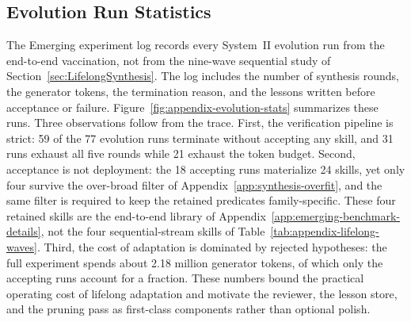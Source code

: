 \subsection{Evolution Run Statistics}
\label{app:evolution-stats}




The Emerging experiment log records every System~II evolution run
from the end-to-end vaccination, not from the nine-wave sequential
study of Section~\ref{sec:LifelongSynthesis}.
The log includes the number of synthesis rounds, the generator tokens, the
termination reason, and the lessons written before acceptance or failure.
Figure~\ref{fig:appendix-evolution-stats} summarizes these runs.
Three observations follow from the trace.
First, the verification pipeline is strict: 59 of the 77 evolution runs
terminate without accepting any skill, and 31 runs exhaust all five
rounds while 21 exhaust the token budget.
Second, acceptance is not deployment: the 18 accepting runs
materialize 24 skills, yet only four survive the over-broad filter of
Appendix~\ref{app:synthesis-overfit}, and the same filter is required to
keep the retained predicates family-specific.
These four retained skills are the end-to-end library of
Appendix~\ref{app:emerging-benchmark-details}, not the four sequential-stream
skills of Table~\ref{tab:appendix-lifelong-waves}.
Third, the cost of adaptation is dominated by rejected hypotheses: the
full experiment spends about 2.18 million generator tokens, of which only
the accepting runs account for a fraction.
These numbers bound the practical operating cost of lifelong adaptation and
motivate the reviewer, the lesson store, and the pruning pass as first-class
components rather than optional polish.
